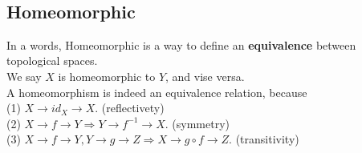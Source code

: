 \documentclass[openany,10pt]{book}
\theoremstyle{definition}
\theoremstyle{definition}
\theoremstyle{remark}
\begin{document}
\\
\subsection{Homeomorphic}
In a words, Homeomorphic is a way to define an \textbf{equivalence} between topological spaces.
\\
We say $X$ is homeomorphic to $Y$, and vise versa.\\
A homeomorphism is indeed an equivalence relation, because \\
(1) $X\to id_X\to X$. (reflectivety)\\
(2) $X\to f\to Y\Rightarrow Y\to f^{-1}\to X$. (symmetry)\\
(3) $X\to f\to Y, Y\to g\to Z\Rightarrow X\to g\circ f\to Z$. (transitivity)
\end{document}
